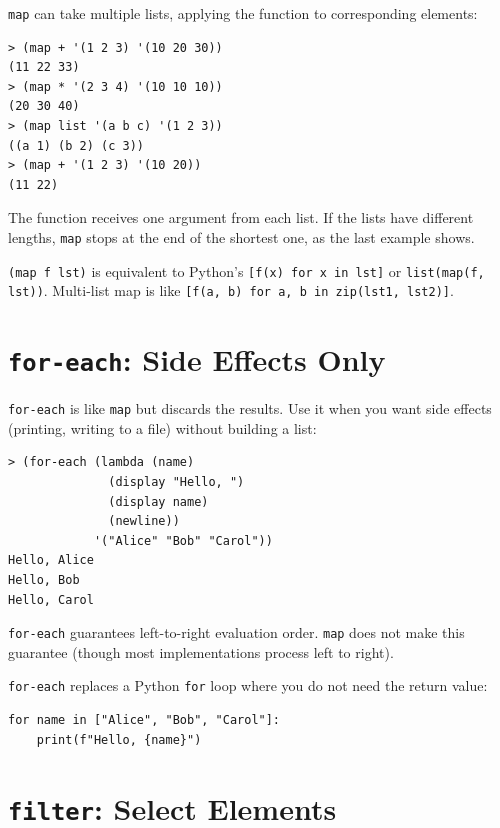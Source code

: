 \texttt{map} can take multiple lists, applying the function to corresponding elements:

\begin{lstlisting}[style=repl]
> (map + '(1 2 3) '(10 20 30))
(11 22 33)
> (map * '(2 3 4) '(10 10 10))
(20 30 40)
> (map list '(a b c) '(1 2 3))
((a 1) (b 2) (c 3))
> (map + '(1 2 3) '(10 20))
(11 22)
\end{lstlisting}

The function receives one argument from each list. If the lists have different lengths, \texttt{map} stops at the end of the shortest one, as the last example shows.

\begin{note}
\texttt{(map f lst)} is equivalent to Python's \texttt{[f(x) for x in lst]} or \texttt{list(map(f, lst))}. Multi-list map is like \texttt{[f(a, b) for a, b in zip(lst1, lst2)]}.
\end{note}

\section{\texttt{for-each}: Side Effects Only}

\texttt{for-each} is like \texttt{map} but discards the results. Use it when you want side effects (printing, writing to a file) without building a list:

\begin{lstlisting}[style=repl]
> (for-each (lambda (name)
              (display "Hello, ")
              (display name)
              (newline))
            '("Alice" "Bob" "Carol"))
Hello, Alice
Hello, Bob
Hello, Carol
\end{lstlisting}

\texttt{for-each} guarantees left-to-right evaluation order. \texttt{map} does not make this guarantee (though most implementations process left to right).

\begin{note}
\texttt{for-each} replaces a Python \texttt{for} loop where you do not need the return value:
\begin{Verbatim}[fontsize=\small]
for name in ["Alice", "Bob", "Carol"]:
    print(f"Hello, {name}")
\end{Verbatim}
\end{note}

\section{\texttt{filter}: Select Elements}

